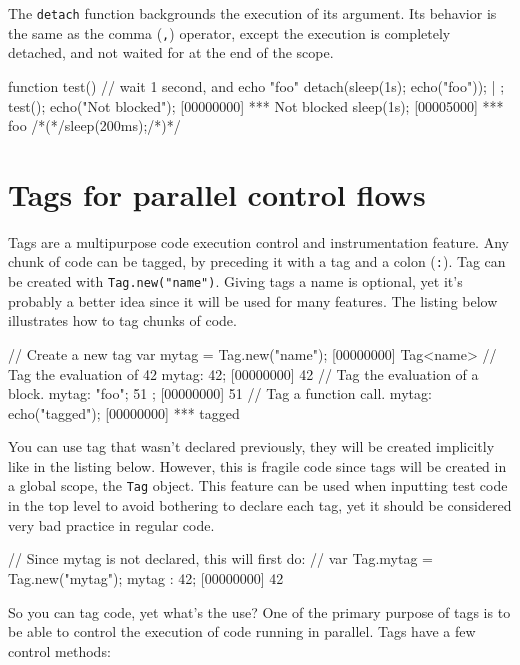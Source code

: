 The \lstinline{detach} function backgrounds the execution of its
argument. Its behavior is the same as the comma (\lstinline{,}) operator,
except the execution is completely detached, and not waited for at the
end of the scope.

\begin{urbiscript}
function test()
{
  // wait 1 second, and echo "foo"
  detach({sleep(1s); echo("foo")});
} | {};
test();
echo("Not blocked");
[00000000] *** Not blocked
sleep(1s);
[00005000] *** foo
/*(*/sleep(200ms);/*)*/
\end{urbiscript}

\section{Tags for parallel control flows}
\label{sec:tut:tags}

Tags are a multipurpose code execution control and instrumentation
feature. Any chunk of code can be tagged, by preceding it with a tag
and a colon (\lstinline{:}). Tag can be created with
\lstinline|Tag.new("name")|. Giving tags a name is optional, yet it's
probably a better idea since it will be used for many
features. The listing below illustrates how to tag chunks of code.

\begin{urbiscript}
// Create a new tag
var mytag = Tag.new("name");
[00000000] Tag<name>
// Tag the evaluation of 42
mytag: 42;
[00000000] 42
// Tag the evaluation of a block.
mytag: { "foo"; 51 };
[00000000] 51
// Tag a function call.
mytag: echo("tagged");
[00000000] *** tagged
\end{urbiscript}

You can use tag that wasn't declared previously, they will be created
implicitly like in the listing below. However, this is fragile code since
tags will be created in a global scope, the \lstinline{Tag} object. This
feature can be used when inputting test code in the top level to avoid
bothering to declare each tag, yet it should be considered very bad
practice in regular code.

\begin{urbiscript}
// Since mytag is not declared, this will first do:
// var Tag.mytag = Tag.new("mytag");
mytag : 42;
[00000000] 42
\end{urbiscript}

So you can tag code, yet what's the use? One of the primary purpose of
tags is to be able to control the execution of code running in
parallel. Tags have a few control methods:

